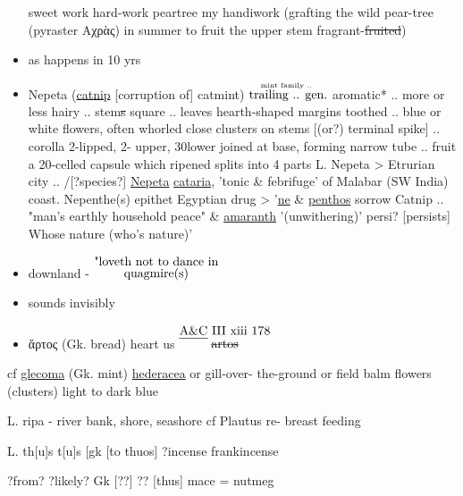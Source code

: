 \documentclass[a4paper,12pt]{article}
\begin{document}
\begin{flushleft}
\begin{itemize}
sweet 
work hard-work
peartree my handiwork
(grafting the wild pear-tree (pyraster \textgreek{Αχρὰς})
in summer to fruit the upper stem
fragrant-\sout{fruited})
\item as happens in 10 yrs
\item Nepeta%
 (\ul{catnip} [corruption of] catmint) 
 {$\stackrel
	{\hbox
		{\tiny
			{mint family ..}
		}
	}
	{\hbox
		{trailing .. gen.}
	}
$} 
aromatic* .. more or less hairy .. stem\sout{s} square
.. leaves hearth-shaped margins toothed ..
blue or white flowers, often whorled close
clusters on stems [(or?) terminal spike] .. corolla 2-lipped, 2-
upper, 30lower joined at base, forming 
narrow tube .. fruit a 20-celled capsule
which ripened splits into 4 parts
L. Nepeta > Etrurian city .. /[?species?] \ul{Nepeta}
\ul{cataria}, 'tonic \& febrifuge' of Malabar
(SW India) coast. Nepenthe(s) epithet
Egyptian drug > '\ul{ne} \& \ul{penthos} sorrow
Catnip .. "man's earthly household peace"
\& \ul{amaranth} '(unwithering)' persi? [persists] Whose
nature (who's nature)'
\item downland - {$\stackrel{\hbox{"loveth not to dance in}}{\hbox{quagmire(s)}}$}%
\item sounds invisibly
\item \textgreek{ἄρτος}  (Gk. bread) heart us 
{$\stackrel
	{\hbox
		{\ul
		{A\&C} 
		III xiii 178
		}
	}
	{\hbox
		{\sout
		{artos} 
		}
	}
$} 
\end{itemize}

cf \ul{glecoma}
(Gk. mint)
\ul{hederacea}
or gill-over-
the-ground
or field balm
flowers (clusters)
light to dark
blue

L. ripa - river
bank, shore,
seashore
cf Plautus  re-
breast
feeding

L. th[u]s t[u]s [gk [to thuos]
?incense
frankincense

?from?
?likely? Gk [??]
?? [thus]
mace =
nutmeg
\end{flushleft}
\end{document}
